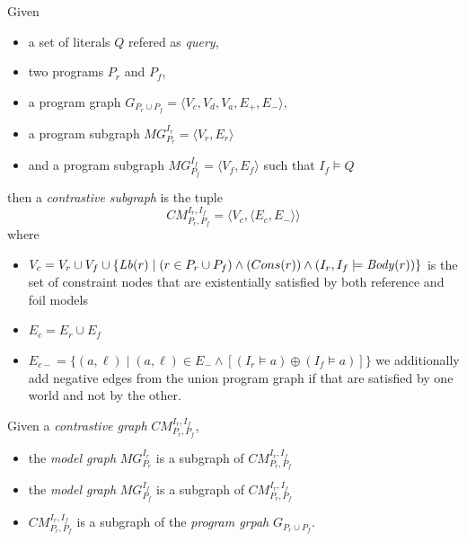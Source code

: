\begin{definition}
  Given
  \begin{itemize}
    \item
    a set of literals $Q$ refered as \emph{query},
    \item
    two programs $P_r$ and $P_f$,
    \item
    a program graph $G_{P_r \cup P_f} = \langle V_c, V_d, V_a, E_{+}, E_{-} \rangle$,
    \item
    a program subgraph $MG_{P_r}^{I_r} = \langle V_r, E_r \rangle$
    \item
    and
    a program subgraph $MG_{P_f}^{I_f} = \langle V_f, E_f \rangle$ such that $I_f \models Q$
  \end{itemize}
  then
  a \emph{contrastive subgraph} is the tuple
  \[
  CM_{P_r, P_f}^{I_r, I_f} =
  \langle
    V_c, %
    \langle E_c, E_{-} \rangle  %
  \rangle
  \]
  where
  \begin{itemize}
    \item  $V_c = V_r \cup V_f \cup \{ \mathit{Lb}(r) \mid (r \in P_r \cup P_f) \land (Cons(r)) \land (I_r, I_f \models \mathit{Body}(r)) \}$
    is the set of constraint nodes that are existentially satisfied by both reference and foil models

    \item $E_c = E_r \cup E_f$
    \item $E_{c-} = \{ (a, \ell) \mid (a, \ell) \in E_{-} \land [ (I_r \models a) \oplus (I_f \models a)]\}$
    we additionally add negative edges from the union program graph if that are satisfied by one world and not by the other.
  \end{itemize}
\end{definition}
%
\begin{proposition}
  Given a \emph{contrastive graph} $CM_{P_r, P_f}^{I_r, I_f}$,
  \begin{itemize}
    \item the \emph{model graph} $MG_{P_r}^{I_r}$ is a subgraph of $CM_{P_r, P_f}^{I_r, I_f}$
    \item the \emph{model graph} $MG_{P_f}^{I_f}$ is a subgraph of $CM_{P_r, P_f}^{I_r, I_f}$
    \item $CM_{P_r, P_f}^{I_r, I_f}$ is a subgraph of the \emph{program grpah} $G_{P_r \cup P_f}$.
  \end{itemize}
\end{proposition}
%

